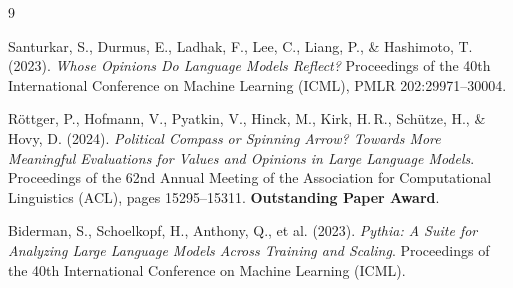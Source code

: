 \documentclass[../relazione.tex]{subfiles}
\begin{document}
\begin{thebibliography}{9}

Santurkar, S., Durmus, E., Ladhak, F., Lee, C., Liang, P., \& Hashimoto, T. (2023).
\emph{Whose Opinions Do Language Models Reflect?}
Proceedings of the 40th International Conference on Machine Learning (ICML), PMLR 202:29971--30004.

Röttger, P., Hofmann, V., Pyatkin, V., Hinck, M., Kirk, H.\,R., Schütze, H., \& Hovy, D. (2024).
\emph{Political Compass or Spinning Arrow? Towards More Meaningful Evaluations for Values and Opinions in Large Language Models}.
Proceedings of the 62nd Annual Meeting of the Association for Computational Linguistics (ACL), pages 15295--15311. \textbf{Outstanding Paper Award}.

Biderman, S., Schoelkopf, H., Anthony, Q., et al. (2023).
\emph{Pythia: A Suite for Analyzing Large Language Models Across Training and Scaling}.
Proceedings of the 40th International Conference on Machine Learning (ICML).


\end{thebibliography}
\end{document}

